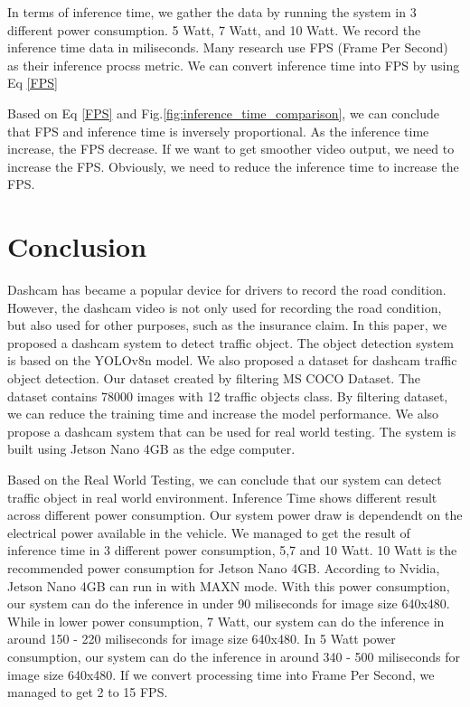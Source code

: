 \documentclass[conference]{IEEEtran}
\begin{document}
In terms of inference time, we gather the data by running the system in 3 different power consumption. 5 Watt, 7 Watt, and 10 Watt. We record the inference time data in miliseconds.
Many research use FPS (Frame Per Second) as their inference procss metric. We can convert inference time into FPS by using Eq \eqref{FPS}

Based on Eq \eqref{FPS} and Fig.\ref{fig:inference_time_comparison}, we can conclude that FPS and inference time is inversely proportional. As the inference time increase, the FPS decrease.
If we want to get smoother video output, we need to increase the FPS. Obviously, we need to reduce the inference time to increase the FPS.

\section{Conclusion}
Dashcam has became a popular device for drivers to record the road condition. However, the dashcam video is not only used for recording the road condition, but also used for other purposes, such as the insurance claim. 
In this paper, we proposed a dashcam system to detect traffic object. The object detection system is based on the YOLOv8n model. We also proposed a dataset for dashcam traffic object detection. Our dataset created by filtering MS COCO Dataset. The dataset contains 78000 images with 12 traffic objects class.
By filtering dataset, we can reduce the training time and increase the model performance.
We also propose a dashcam system that can be used for real world testing. The system is built using Jetson Nano 4GB as the edge computer.


Based on the Real World Testing, we can conclude that our system can detect traffic object in real world environment. Inference Time shows different result across different power consumption.
Our system power draw is dependendt on the electrical power available in the vehicle. We managed to get the result of inference time in 3 different power consumption, 5,7 and 10 Watt.
10 Watt is the recommended power consumption for Jetson Nano 4GB. According to Nvidia, Jetson Nano 4GB can run in with MAXN mode. 
With this power consumption, our system can do the inference in under 90 miliseconds for image size 640x480.
While in lower power consumption, 7 Watt, our system can do the inference in around 150 - 220 miliseconds for image size 640x480.
In 5 Watt power consumption, our system can do the inference in around 340 - 500 miliseconds for image size 640x480.
If we convert processing time into Frame Per Second, we managed to get 2 to 15 FPS.
\end{document}
